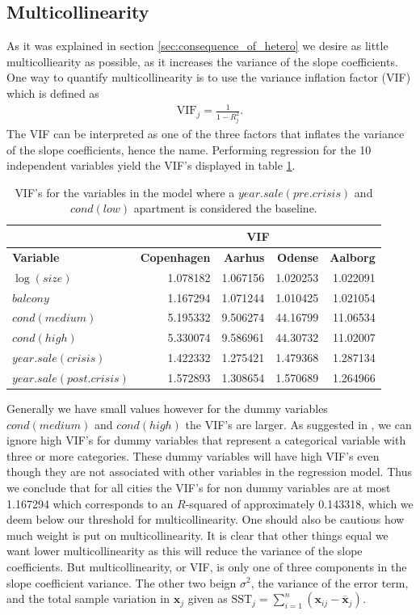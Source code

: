 \subsection{Multicollinearity}
As it was explained in section \ref{sec:consequence_of_hetero} we desire as little multicolliearity as possible, as it increases the variance of the slope coefficients.
One way to quantify multicollinearity is
to use the variance inflation factor (VIF) which is defined as
\begin{align*}
    \text{VIF}_j = \frac{1}{1 - R^2_j}.
\end{align*}
The VIF can be interpreted as one of the three factors that inflates the variance of the slope coefficients, hence the name.
Performing regression for the 10 independent variables yield the VIF's displayed in table \ref{tbl:vif}.
\begin{table}[H]
    \centering
    \begin{tabular}{lrrrr}
        \toprule
        & \multicolumn{4}{c}{\textbf{VIF}} \\
        \midrule
        \textbf{Variable} & \textbf{Copenhagen} & \textbf{Aarhus} & \textbf{Odense} & \textbf{Aalborg} \\
        \midrule
        $\log(size)$                & 1.078182 & 1.067156 & 1.020253 & 1.022091 \\
        $balcony$                   & 1.167294 & 1.071244 & 1.010425 & 1.021054 \\
        $cond(medium)$              & 5.195332 & 9.506274 & 44.16799 & 11.06534 \\
        $cond(high)$                & 5.330074 & 9.586961 & 44.30732 & 11.02007 \\
        $year.sale(crisis)$         & 1.422332 & 1.275421 & 1.479368 & 1.287134 \\
        $year.sale(post.crisis)$    & 1.572893 & 1.308654 & 1.570689 & 1.264966 \\
        \bottomrule
    \end{tabular}
    \caption{VIF's for the variables in the model where a $year.sale(pre.crisis)$ and $cond(low)$ apartment is considered the baseline.}
    \label{tbl:vif}
\end{table}
Generally we have small values however for the dummy variables $cond(medium)$ and $cond(high)$ the VIF's are larger.
As suggested in \cite{Allison2012}, we can ignore high VIF's for dummy variables that represent a categorical variable with three or more categories.
These dummy variables will have high VIF's even though they are not associated with other variables in the regression model.
Thus we conclude that for all cities the VIF's for non dummy variables are at most 1.167294 which corresponds to an $R$-squared of approximately 0.143318, which we deem below our threshold for multicollinearity.
One should also be cautious how much weight is put on multicollinearity.
It is clear that other things equal we want lower multicollinearity as this will reduce the variance of the slope coefficients.
But multicollinearity, or VIF, is only one of three components in the slope coefficient variance.
The other two beign $\sigma^2$, the variance of the error term, and the total sample variation in $\textbf{x}_j$ given as $\text{SST}_j = \sum_{i=1}^n(\textbf{x}_{ij} - \overline{\textbf{x}}_j)$.